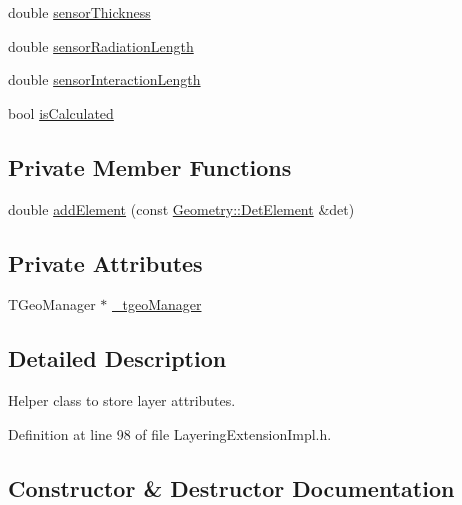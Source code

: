 \begin{DoxyCompactItemize}
double \hyperlink{struct_d_d4hep_1_1_d_d_rec_1_1_layering_extension_impl_1_1_layer_attributes_a7d63afe728d3ef686cc9130188abce0e}{sensor\+Thickness}
\item 
double \hyperlink{struct_d_d4hep_1_1_d_d_rec_1_1_layering_extension_impl_1_1_layer_attributes_addc3c7d619e7a52a23222ec6ffed2833}{sensor\+Radiation\+Length}
\item 
double \hyperlink{struct_d_d4hep_1_1_d_d_rec_1_1_layering_extension_impl_1_1_layer_attributes_a3fab0dd2b11df5f60de6355c0b83ca44}{sensor\+Interaction\+Length}
\item 
bool \hyperlink{struct_d_d4hep_1_1_d_d_rec_1_1_layering_extension_impl_1_1_layer_attributes_a0ddd6974f8568e8b28e3a258384ac582}{is\+Calculated}
\end{DoxyCompactItemize}
\subsection*{Private Member Functions}
\begin{DoxyCompactItemize}
\item 
double \hyperlink{struct_d_d4hep_1_1_d_d_rec_1_1_layering_extension_impl_1_1_layer_attributes_a39fc239560d87538d35e8e5051b9b0aa}{add\+Element} (const \hyperlink{class_d_d4hep_1_1_geometry_1_1_det_element}{Geometry\+::\+Det\+Element} \&det)
\end{DoxyCompactItemize}
\subsection*{Private Attributes}
\begin{DoxyCompactItemize}
\item 
T\+Geo\+Manager $\ast$ \hyperlink{struct_d_d4hep_1_1_d_d_rec_1_1_layering_extension_impl_1_1_layer_attributes_a14263508e7633f4d41ea796eea116f1e}{\+\_\+tgeo\+Manager}
\end{DoxyCompactItemize}


\subsection{Detailed Description}
Helper class to store layer attributes. 

Definition at line 98 of file Layering\+Extension\+Impl.\+h.



\subsection{Constructor \& Destructor Documentation}
\hypertarget{struct_d_d4hep_1_1_d_d_rec_1_1_layering_extension_impl_1_1_layer_attributes_a74da79c055a10ae02187e41717de53d6}{}\label{struct_d_d4hep_1_1_d_d_rec_1_1_layering_extension_impl_1_1_layer_attributes_a74da79c055a10ae02187e41717de53d6} 
